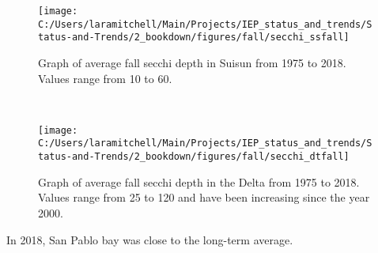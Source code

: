 \documentclass[
]{book}
\begin{document}
\begin{panel-grid}
\begin{columns-nocenter}
\begin{column40}
\end{column40}

\begin{column800}

\begin{expand}

\begin{figure}
\texttt{[image: C:/Users/laramitchell/Main/Projects/IEP\_status\_and\_trends/Status-and-Trends/2\_bookdown/figures/fall/secchi\_ssfall]} \caption{Graph of average fall secchi depth in Suisun from 1975 to 2018. Values range from 10 to 60.}\label{fig:unnamed-chunk-97}
\end{figure}

\end{expand}

\end{column800}

\begin{column40}

~

\end{column40}

\begin{column800}

\begin{expand}

\begin{figure}
\texttt{[image: C:/Users/laramitchell/Main/Projects/IEP\_status\_and\_trends/Status-and-Trends/2\_bookdown/figures/fall/secchi\_dtfall]} \caption{Graph of average fall secchi depth in the Delta from 1975 to 2018. Values range from 25 to 120 and have been increasing since the year 2000.}\label{fig:unnamed-chunk-98}
\end{figure}

\end{expand}

\end{column800}

\end{columns-nocenter}

\begin{columns-nocenter}

\begin{column800}

In 2018, San Pablo bay was close to the long-term average.

\end{column800}

\begin{column40}


\end{column40}
\end{columns-nocenter}
\end{panel-grid}
\end{document}
